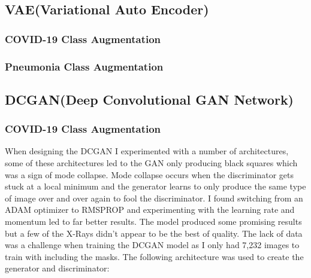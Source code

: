 \subsection{VAE(Variational Auto Encoder)}
\subsubsection{COVID-19 Class Augmentation}
\subsubsection{Pneumonia Class Augmentation}

\subsection{DCGAN(Deep Convolutional GAN Network)}
\subsubsection{COVID-19 Class Augmentation}
When designing the DCGAN I experimented with a number of architectures, some of these architectures led to the GAN only producing black squares which was a sign of mode collapse.  Mode collapse occurs when the discriminator gets stuck at a local minimum and the generator learns to only produce the same type of image over and over again to fool the discriminator. I found switching from an ADAM optimizer to RMSPROP and experimenting with the learning rate and momentum led to far better results.  The model produced some promising results but a few of the X-Rays didn't appear to be the best of quality.  The lack of data was a challenge when training the DCGAN model as I only had 7,232 images to train with including the masks.    The following architecture was used to create the generator and discriminator:
